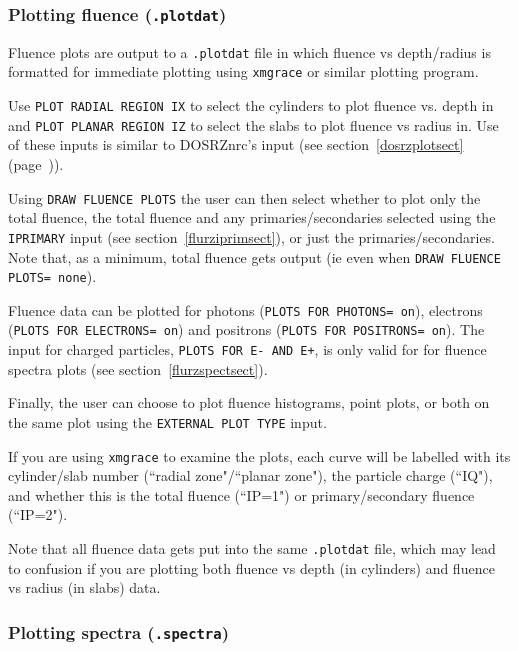 \documentclass[12pt,twoside]{article}  %
\newcommand{\lpage}[1]{(page~\pageref{#1})}
\begin{document}
\subsubsection{Plotting fluence ({\tt .plotdat})}
\label{flurzfluencesect}

Fluence plots are output to a {\tt .plotdat} file in which fluence
vs depth/radius is formatted for immediate plotting using {\tt xmgrace} or similar
plotting program.

Use {\tt PLOT RADIAL REGION IX} to select the cylinders to plot
fluence vs. depth in and {\tt PLOT PLANAR REGION IZ} to select the slabs
to plot fluence vs radius in.  Use of these inputs is similar to DOSRZnrc's
input (see section~\ref{dosrzplotsect}\lpage{dosrzplotsect}).

Using {\tt DRAW FLUENCE PLOTS} the user can then select whether to plot
only the total fluence, the total fluence and any primaries/secondaries
selected using the {\tt IPRIMARY} input (see section~\ref{flurziprimsect}),
or just the primaries/secondaries.  Note that, as a minimum, total fluence
gets output (ie even when {\tt DRAW FLUENCE PLOTS= none}).

Fluence data can be plotted for photons ({\tt PLOTS FOR PHOTONS= on}),
electrons ({\tt PLOTS FOR ELECTRONS= on}) and positrons
({\tt PLOTS FOR POSITRONS= on}).  The input for charged particles,
{\tt PLOTS FOR E- AND E+}, is only valid for for fluence spectra plots
(see section~\ref{flurzspectsect}).

Finally, the user can choose to plot fluence histograms, point plots, or
both on the same plot using the {\tt EXTERNAL PLOT TYPE} input.

If you are using {\tt xmgrace} to examine the plots, each curve will be labelled
with its cylinder/slab number (``radial zone"/``planar zone"), the
particle charge (``IQ"), and whether this is
the total fluence (``IP=1") or primary/secondary fluence (``IP=2").

Note that all fluence data gets put into the same {\tt .plotdat} file, which
may lead to confusion if you are plotting both fluence vs depth (in
cylinders) and fluence
vs radius (in slabs) data.

\subsubsection{Plotting spectra ({\tt .spectra})}
\label{flurzspectsect}
\end{document}
